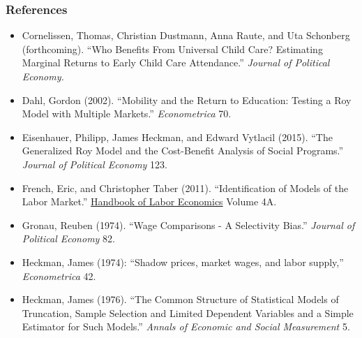 \documentclass[blue]{beamer}
\begin{document}
{{\frametitle{References}
\begin{itemize}
\item {\scriptsize Cornelissen, Thomas, Christian Dustmann, Anna Raute, and
Uta Schonberg (forthcoming). ``Who Benefits From Universal Child
Care? Estimating Marginal Returns to Early Child Care Attendance.''
}{\scriptsize\emph{Journal of Political Economy.}}{\scriptsize\par}
\item {\scriptsize Dahl, Gordon (2002). \textquotedblleft Mobility and the
Return to Education: Testing a Roy Model with Multiple Markets.\textquotedblright{}
}{\scriptsize\textit{Econometrica}}{\scriptsize{} 70.}{\scriptsize\par}
\item {\scriptsize Eisenhauer, Philipp, James Heckman, and Edward Vytlacil
(2015). ``The Generalized Roy Model and the Cost-Benefit Analysis
of Social Programs.'' }{\scriptsize\emph{Journal of Political Economy
}}{\scriptsize 123.}{\scriptsize\par}
\item {\scriptsize French, Eric, and Christopher Taber (2011). ``Identification
of Models of the Labor Market.'' }{\scriptsize\uline{Handbook of
Labor Economics}}{\scriptsize{} Volume 4A.}{\scriptsize\par}
\item {\scriptsize Gronau, Reuben (1974). ``Wage Comparisons - A Selectivity
Bias.'' }{\scriptsize\emph{Journal of Political Economy }}{\scriptsize 82.}{\scriptsize\par}
\item {\scriptsize Heckman, James (1974): \textquotedblleft Shadow prices,
market wages, and labor supply,\textquotedblright{} }{\scriptsize\emph{Econometrica}}{\scriptsize{}
42.}{\scriptsize\par}
\item {\scriptsize Heckman, James (1976). ``The Common Structure of Statistical
Models of Truncation, Sample Selection and Limited Dependent Variables
and a Simple Estimator for Such Models.'' }{\scriptsize\emph{Annals
of Economic and Social Measurement }}{\scriptsize 5.}{\scriptsize\par}
\end{itemize}
}

\frame{ 

}}
\end{document}
